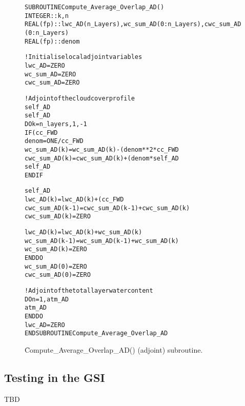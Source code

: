 \begin{figure}[H]
  \caption{\f{Compute\_Average\_Overlap\_AD()} (adjoint) subroutine.}
  \label{fig:Compute_Average_Overlap_AD_subroutine}
  \lineacrosspage
  \centering
  \begin{alltt}
SUBROUTINE Compute_Average_Overlap_AD()
  INTEGER  :: k, n
  REAL(fp) :: lwc_AD(n_Layers), wc_sum_AD(0:n_Layers), cwc_sum_AD(0:n_Layers)
  REAL(fp) :: denom

  ! Initialise local adjoint variables
  lwc_AD     = ZERO
  wc_sum_AD  = ZERO
  cwc_sum_AD = ZERO

  ! Adjoint of the cloud cover profile
  self_AD%Cloud_Cover(n_layers) = self_AD%Cloud_Cover(n_layers) + self_AD%Total_Cloud_Cover
  self_AD%Total_Cloud_Cover = ZERO
  DO k = n_layers, 1, -1
    IF ( cc_FWD%iVar%wc_sum(k) > ZERO ) THEN
      denom = ONE/cc_FWD%iVar%wc_sum(k)
      wc_sum_AD(k)  = wc_sum_AD(k)  - (denom**2 * cc_FWD%iVar%cwc_sum(k) * self_AD%Cloud_Cover(k))
      cwc_sum_AD(k) = cwc_sum_AD(k) + (denom                             * self_AD%Cloud_Cover(k))
      self_AD%Cloud_Cover(k) = ZERO
    END IF

    self_AD%Cloud_Fraction(k) = self_AD%Cloud_Fraction(k) + (cc_FWD%iVar%lwc(k)       * cwc_sum_AD(k))
    lwc_AD(k)                 = lwc_AD(k)                 + (cc_FWD%Cloud_Fraction(k) * cwc_sum_AD(k))
    cwc_sum_AD(k-1)           = cwc_sum_AD(k-1)           + cwc_sum_AD(k)
    cwc_sum_AD(k)             = ZERO

    lwc_AD(k)      = lwc_AD(k)      + wc_sum_AD(k)
    wc_sum_AD(k-1) = wc_sum_AD(k-1) + wc_sum_AD(k)
    wc_sum_AD(k)   = ZERO
  END DO
  wc_sum_AD(0)  = ZERO
  cwc_sum_AD(0) = ZERO

  ! Adjoint of the total layer water content
  DO n = 1, atm_AD%n_Clouds
    atm_AD%Cloud(n)%Water_Content(1:n_layers) = atm_AD%Cloud(n)%Water_Content(1:n_layers) + lwc_AD
  END DO
  lwc_AD = ZERO
END SUBROUTINE Compute_Average_Overlap_AD\end{alltt}
  \lineacrosspage
\end{figure}


\subsection{Testing in the GSI}

TBD


